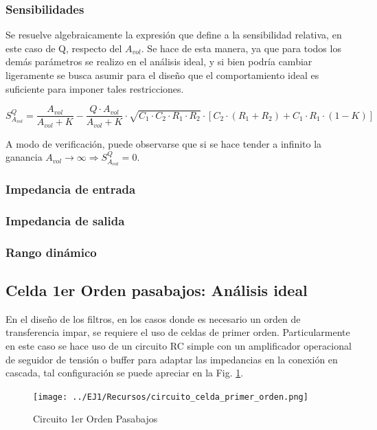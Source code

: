 \subsubsection{Sensibilidades}
Se resuelve algebraicamente la expresi\'on que define a la sensibilidad relativa, en este caso de Q, respecto del $A_{vol}$. Se hace de esta manera, ya que para todos los dem\'as par\'ametros
se realizo en el an\'alisis ideal, y si bien podr\'ia cambiar ligeramente se busca asumir para el dise\~no que el comportamiento ideal es suficiente para imponer tales restricciones.

\begin{equation}
    S^{Q}_{A_{vol}} = \frac{A_{vol}}{A_{vol} + K}
    - \frac{Q \cdot A_{vol}}{A_{vol} + K} \cdot \sqrt{C_1 \cdot C_2 \cdot R_1 \cdot R_2}
    \cdot \left[ C_2 \cdot (R_1 + R_2) + C_1 \cdot R_1 \cdot (1 - K) \right]
\end{equation}

A modo de verificaci\'on, puede observarse que si se hace tender a infinito la ganancia $A_{vol} \rightarrow \infty \Rightarrow S^{Q}_{A_{vol}} = 0$.

\subsubsection{Impedancia de entrada}

\subsubsection{Impedancia de salida}

\subsubsection{Rango din\'amico}

\subsection{Celda 1er Orden pasabajos: An\'alisis ideal}
En el dise\~no de los filtros, en los casos donde es necesario un orden de transferencia impar, se requiere el uso de celdas de primer orden.
Particularmente en este caso se hace uso de un circuito RC simple con un amplificador operacional de seguidor de tensi\'on o buffer para adaptar las impedancias en la conexi\'on en cascada,
tal configuraci\'on se puede apreciar en la Fig. \ref{fig:circuito_pasabajos_primer_orden}.

\begin{figure}[H]
    \centering
        \texttt{[image: ../EJ1/Recursos/circuito\_celda\_primer\_orden.png]}
    \caption{Circuito 1er Orden Pasabajos}
    \label{fig:circuito_pasabajos_primer_orden}
\end{figure}

